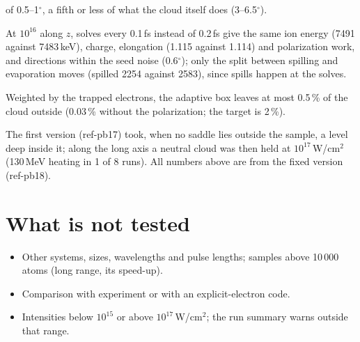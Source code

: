\begin{description}
    of 0.5--1$^\circ$, a fifth or less of what the cloud itself does (3--6.5$^\circ$).
  \item[Solve interval.] At $10^{16}$ along $z$, solves every 0.1\,fs instead of 0.2\,fs give the same ion energy
    (7491 against 7483\,keV), charge, elongation (1.115 against 1.114) and polarization work, and directions within
    the seed noise (0.6$^\circ$); only the split between spilling and evaporation moves (spilled 2254 against 2583),
    since spills happen at the solves.
  \item[The box.] Weighted by the trapped electrons, the adaptive box leaves at most 0.5\,\% of the cloud outside
    (0.03\,\% without the polarization; the target is 2\,\%).
  \item[The escape-level fix.] The first version (ref-pb17) took, when no saddle lies outside the sample, a level
    deep inside it; along the long axis a neutral cloud was then held at $10^{17}$\,W/cm$^2$ (130\,MeV heating in 1
    of 8 runs). All numbers above are from the fixed version (ref-pb18).
\end{description}

\section{What is not tested}

\begin{itemize}
  \item Other systems, sizes, wavelengths and pulse lengths; samples above 10\,000 atoms (long range, its speed-up).
  \item Comparison with experiment or with an explicit-electron code.
  \item Intensities below $10^{15}$ or above $10^{17}$\,W/cm$^2$; the run summary warns outside that range.
\end{itemize}

